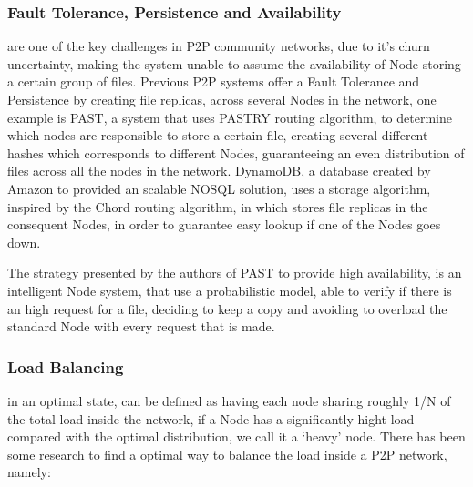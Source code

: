 \subsubsection{\textbf{Fault Tolerance, Persistence and Availability}}\label{par:Fault Tolerance, Persistence and Availability}

are one of the key challenges in P2P community networks, due to it's churn uncertainty, making the system unable to assume the availability of Node storing a certain group of files. Previous P2P systems offer a Fault Tolerance and Persistence by creating file replicas, across several Nodes in the network, one example is PAST\cite{Rowstron2001}\cite{Rowstron2001a}, a system that uses PASTRY routing algorithm, to determine which nodes are responsible to store a certain file, creating several different hashes which corresponds to different Nodes, guaranteeing an even distribution of files across all the nodes in the network. DynamoDB\cite{Decandia2007}, a database created by Amazon to provided an scalable NOSQL solution, uses a storage algorithm, inspired by the Chord routing algorithm, in which stores file replicas in the consequent Nodes, in order to guarantee easy lookup if one of the Nodes goes down.

The strategy presented by the authors of PAST to provide high availability, is an intelligent Node system, that use a probabilistic model, able to verify if there is an high request for a file, deciding to keep a copy and avoiding to overload the standard Node with every request that is made.

\subsubsection{\textbf{Load Balancing}}\label{par:load_balancing}

in an optimal state, can be defined as having each node sharing roughly 1/N of the total load inside the network, if a Node has a significantly hight load compared with the optimal distribution, we call it a `heavy' node. There has been some research to find a optimal way to balance the load inside a P2P network, namely:

